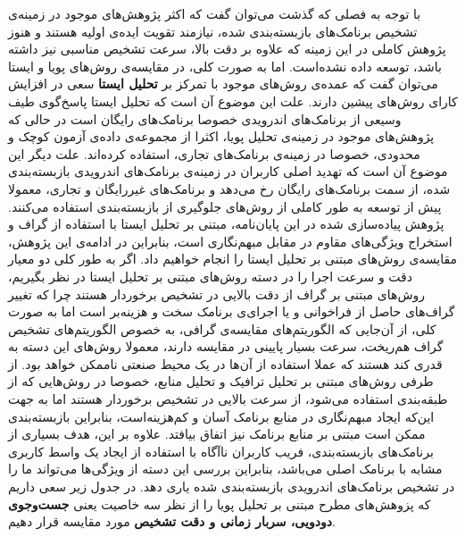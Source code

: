 با توجه به فصلی که گذشت می‌توان گفت که اکثر پژوهش‌های موجود در زمینه‌ی تشخیص برنامک‌های بازبسته‌بندی شده، نیازمند تقویت ایده‌ی اولیه هستند و هنوز پژوهش کاملی در این زمینه که علاوه بر دقت بالا، سرعت تشخیص مناسبی نیز داشته باشد، توسعه داده نشده‌است. اما به صورت کلی، در مقایسه‌ی روش‌های پویا و ایستا می‌توان گفت که عمده‌ی روش‌های موجود با تمرکز بر \textbf{تحلیل ایستا }سعی در افزایش کارای روش‌های پیشین دارند. علت این موضوع آن است که تحلیل ایستا پاسخ‌گوی طیف وسیعی از برنامک‌های اندرویدی خصوصا برنامک‌های رایگان است در حالی که پژوهش‌های موجود در زمینه‌ی تحلیل پویا، اکثرا از مجموعه‌ی داده‌ی آزمون کوچک و محدودی، خصوصا در زمینه‌ی برنامک‌های تجاری، استفاده کرده‌اند. علت دیگر این موضوع آن است که تهدید اصلی کاربران در زمینه‌ی برنامک‌های اندرویدی بازبسته‌بندی شده، از سمت برنامک‌های رایگان رخ می‌دهد و برنامک‌های غیررایگان و تجاری، معمولا پیش از توسعه به طور کاملی از روش‌های جلوگیری از بازبسته‌بندی استفاده می‌کنند. پژوهش پیاده‌سازی شده در این پایان‌نامه، مبتنی بر تحلیل ایستا با استفاده از گراف و استخراج ویژگی‌های مقاوم در مقابل مبهم‌نگاری است، بنابراین در ادامه‌ی این پژوهش، مقایسه‌ی روش‌های مبتنی بر تحلیل ایستا را انجام خواهیم داد. اگر به طور کلی دو معیار دقت و سرعت اجرا را در دسته‌ روش‌های مبتنی بر تحلیل ایستا در نظر بگیریم، روش‌های مبتنی بر گراف از دقت بالایی در تشخیص برخوردار هستند چرا که تغییر گراف‌های حاصل از فراخوانی و یا اجرای‌ی برنامک سخت و هزینه‌بر است اما به صورت کلی، از آن‌جایی که الگوریتم‌های مقایسه‌ی گرافی، به خصوص الگوریتم‌های تشخیص گراف هم‌ریخت، سرعت بسیار پایینی در  مقایسه دارند، معمولا روش‌های این دسته به قدری کند هستند که عملا استفاده از آن‌ها در یک محیط صنعتی ناممکن خواهد بود. از طرفی روش‌های مبتنی بر تحلیل ترافیک و تحلیل منابع، خصوصا در روش‌هایی که از طبقه‌بندی استفاده می‌شود، از سرعت بالایی در تشخیص برخوردار هستند اما به جهت این‌که ایجاد مبهم‌نگاری در منابع برنامک آسان و کم‌هزینه‌است، بنابراین بازبسته‌بندی ممکن است مبتنی بر منابع برنامک نیز اتفاق بیافتد. علاوه بر این، هدف بسیاری از برنامک‌های بازبسته‌بندی، فریب کاربران ناآگاه با استفاده از ایجاد یک واسط کاربری مشابه با برنامک اصلی می‌باشد، بنابراین بررسی این دسته از ویژگی‌ها می‌تواند ما را در تشخیص برنامک‌های اندرویدی بازبسته‌بندی شده یاری دهد. در جدول زیر سعی داریم که پزوهش‌های مطرح مبتنی بر تحلیل پویا را از نظر سه خاصیت یعنی \textbf{جست‌وجوی دودویی، سربار زمانی و دقت تشخیص} مورد مقایسه قرار دهیم.
\\

